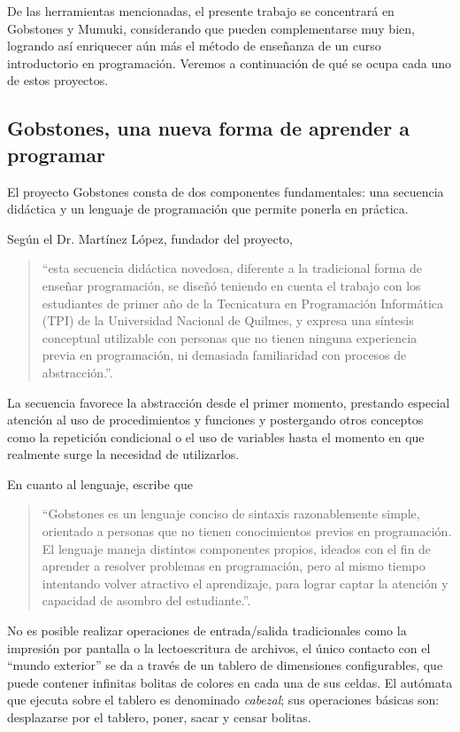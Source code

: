 De las herramientas mencionadas, el presente trabajo se concentrará en Gobstones y Mumuki, considerando que pueden complementarse muy bien, logrando así enriquecer aún más el método de enseñanza de un curso introductorio en programación. Veremos a continuación de qué se ocupa cada uno de estos proyectos.

\subsection{Gobstones, una nueva forma de aprender a programar}
El proyecto Gobstones consta de dos componentes fundamentales: una secuencia didáctica y un lenguaje de programación que permite ponerla en práctica.

Según el Dr. Martínez López, fundador del proyecto,

\begin{quote}
``esta secuencia didáctica novedosa, diferente a la tradicional forma de enseñar programación, se diseñó teniendo en cuenta el trabajo con los estudiantes de primer año de la Tecnicatura en Programación Informática (TPI) de la Universidad Nacional de Quilmes, y expresa una síntesis conceptual utilizable con personas que no tienen ninguna experiencia previa en programación, ni demasiada familiaridad con procesos de abstracción.''\cite{LibroGobstones}.
\end{quote}

La secuencia favorece la abstracción desde el primer momento, prestando especial atención al uso de procedimientos y funciones y postergando otros conceptos como la repetición condicional o el uso de variables hasta el momento en que realmente surge la necesidad de utilizarlos.

En cuanto al lenguaje, escribe que

\begin{quote}
``Gobstones es un lenguaje conciso de sintaxis razonablemente simple, orientado a personas que no tienen conocimientos previos en programación. El lenguaje maneja distintos componentes propios, ideados con el fin de aprender a resolver problemas en programación, pero al mismo tiempo intentando volver atractivo el aprendizaje, para lograr captar la atención y capacidad de asombro del estudiante.''\cite{LibroGobstones}.
\end{quote}

No es posible realizar operaciones de entrada/salida tradicionales como la impresión por pantalla o la lectoescritura de archivos, el único contacto con el ``mundo exterior'' se da a través de un tablero de dimensiones configurables, que puede contener infinitas bolitas de colores en cada una de sus celdas. El autómata que ejecuta sobre el tablero es denominado \textit{cabezal}; sus operaciones básicas son: desplazarse por el tablero, poner, sacar y censar bolitas.

